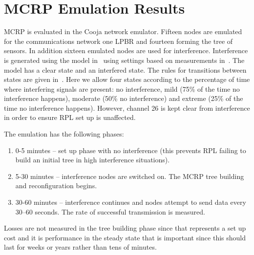 \section{MCRP Emulation Results}
\label{MCRPemulation}

MCRP is evaluated in the Cooja network emulator.  
Fifteen nodes are emulated for the communications network one LPBR and fourteen forming the tree of sensors.  In addition sixteen emulated nodes are used for interference.  
Interference is generated using the model in~\cite{interferenceModel} using settings based on measurements in~\cite{radio2009}. The model has a clear state and an interfered state.  The rules for transitions between states are given in~\cite{interferenceModel}.  Here we allow four states according to the percentage of time where interfering signals are present: no interference, mild (75\% of the time no interference happens), moderate (50\% no interference) and extreme (25\% of the time no interference happens).  However, channel 26 is kept clear from interference in order to ensure RPL set up is unaffected. 



The emulation has the following phases:
\begin{enumerate}
\item 0-5 minutes -- set up phase with no interference (this prevents RPL failing to build an initial tree in high interference situations).
\item 5-30 minutes -- interference nodes are switched on.  The MCRP tree building and reconfiguration begins.
\item 30-60 minutes -- interference continues and nodes attempt to send data every 30--60 seconds.  The rate of successful transmission is measured.
\end{enumerate}
Losses are not measured in the tree building phase since that represents a set up cost and it is performance in the steady state that is important since this should last for weeks or years rather than tens of minutes.

